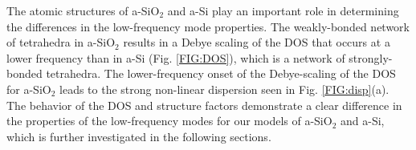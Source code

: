 \documentclass[aps,prb,onecolumn,preprint,superscriptaddress,footinbib,amsmath,amssymb,floatfix]{revtex4}
\begin{document}
The atomic structures of a-SiO$_2$ and a-Si play an important role 
in determining the differences in the low-frequency mode properties. 
The weakly-bonded network of tetrahedra in a-SiO$_2$
\cite{van_Beest_force_1990,kramer_interatomic_1991} 
results in a Debye 
scaling of the DOS that occurs at a lower frequency than in a-Si 
(Fig. \ref{FIG:DOS}), 
which is a network of strongly-bonded tetrahedra.
\cite{stillinger_computer_1985,
allen_diffusons_1999,barkema_high-quality_2000} 
The lower-frequency onset of the Debye-scaling of the DOS 
for a-SiO$_2$ leads to the strong non-linear dispersion 
seen in Fig. \ref{FIG:disp}(a). The behavior of the DOS and 
structure factors demonstrate a clear difference in the properties 
of the low-frequency modes for our models of a-SiO$_2$ and a-Si, which 
is further investigated in the following sections. 
\end{document}
